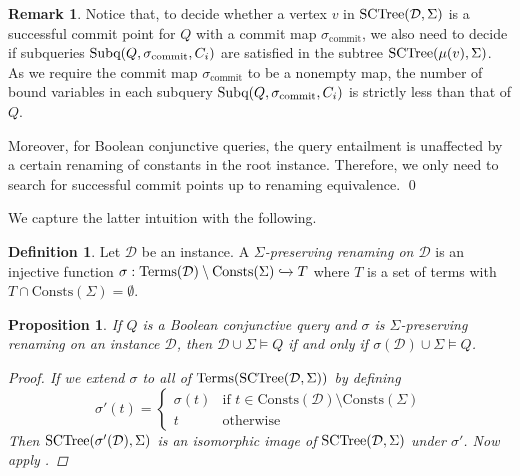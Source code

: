 \documentclass[12pt]{report}
\theoremstyle{plain}
\newtheorem{proposition}[theorem]{Proposition}
\theoremstyle{definition}
\newtheorem{definition}[theorem]{Definition}
\newtheorem{remark}[theorem]{Remark}
\def\Consts{{\mathrm{Consts}}}
\def\Terms{{\mathrm{Terms}}}
\newcommand{\SCTree}[2]{\ensuremath{\normalfont{\textrm{SCTree}}\!\left( #1, #2 \right)}}
\newcommand{\Subq}[3]{\ensuremath{\normalfont{\textrm{Subq}}\!\left( #1, #2, #3 \right)}}
\begin{document}
\begin{remark}
\label{remark:towards-query-answering-procedure}
  Notice that, to decide whether a vertex $v$ in $\SCTree{\mathcal{D}}{\Sigma}$ is a successful commit point for $Q$ with a commit map $\sigma_{\mathrm{commit}}$, we also need to decide if subqueries $\Subq{Q}{\sigma_{\mathrm{commit}}}{C_i}$ are satisfied in the subtree $\SCTree{\mu(v)}{\Sigma}$. As we require the commit map $\sigma_{\mathrm{commit}}$ to be a nonempty map, the number of bound variables in each subquery $\Subq{Q}{\sigma_{\mathrm{commit}}}{C_i}$ is strictly less than that of $Q$.

  Moreover, for Boolean conjunctive queries, the query entailment is unaffected by a certain renaming of constants in the root instance. Therefore, we only need to search for successful commit points up to renaming equivalence.
  \qed
\end{remark}

We capture the latter intuition with the following.

\begin{definition}
  Let $\mathcal{D}$ be an instance. A \emph{$\Sigma$-preserving renaming on $\mathcal{D}$} is an injective function $\sigma: \Terms(\mathcal{D}) \setminus \Consts(\Sigma) \xhookrightarrow{} T$ where $T$ is a set of terms with $T \cap \Consts(\Sigma) = \emptyset$.
\end{definition}

\begin{proposition}
\label{proposition:bcq-invariant-under-sigma-preserving-renaming}
  If $Q$ is a Boolean conjunctive query and $\sigma$ is $\Sigma$-preserving renaming on an instance $\mathcal{D}$, then $\mathcal{D} \cup \Sigma \models Q$ if and only if $\sigma(\mathcal{D}) \cup \Sigma \models Q$.
  \begin{proof}
    If we extend $\sigma$ to all of $\Terms(\SCTree{\mathcal{D}}{\Sigma})$ by defining $$\sigma'(t) =
    \begin{cases}
      \sigma(t) & \text{if } t \in \Consts(\mathcal{D}) \setminus \Consts(\Sigma) \\
      t & \text{otherwise}
    \end{cases}$$
    Then $\SCTree{\sigma'(\mathcal{D})}{\Sigma}$ is an isomorphic image of $\SCTree{\mathcal{D}}{\Sigma}$ under $\sigma'$. Now apply .
  \end{proof}
\end{proposition}
\end{document}
